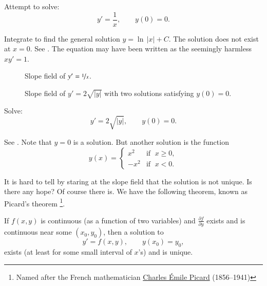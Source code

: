 \documentclass[12pt]{book}
\begin{document}
\begin{example}
Attempt to solve:
\begin{equation*}
y' = \frac{1}{x}, \qquad y(0) = 0 .
\end{equation*}

Integrate to find the general solution $y = \ln \, \lvert x \rvert + C$.  The
solution does not exist at $x=0$.  See .
The equation may have been written as the seemingly harmless $x y' = 1$.

\begin{figure}[h!t]
\begin{center}
\parbox[t]{3.1in}{
 \capstart
 \caption{Slope field of $y' = \nicefrac{1}{x}$.\label{1.3:xinvfig}}
}
\quad
\parbox[t]{3.1in}{
 \capstart
 \caption{Slope field of $y' = 2 \sqrt{\lvert y \rvert}$ with two
 solutions satisfying $y(0) = 0$.\label{1.3:sqrtfig}}
}
\end{center}
\end{figure}
\end{example}

\begin{example}
Solve:
\begin{equation*}
y' = 2 \sqrt{\lvert y \rvert}, \qquad y(0) = 0 .
\end{equation*}

See .
Note that $y=0$ is a solution.  But another solution is the function
\begin{equation*}
y(x) =
\begin{cases}
x^2 & \text{if } \; x \geq 0,\\
-x^2 & \text{if } \; x < 0.
\end{cases}
\end{equation*}
\end{example}

It is hard to tell by staring at the slope field that the
solution is not
unique.
Is there any hope?
Of course there is.  We have the following theorem,
known as Picard's theorem%
\footnote{Named after the French mathematician
\href{http://en.wikipedia.org/wiki/Charles_\%C3\%89mile_Picard}{Charles \'Emile Picard}
(1856--1941)}. 

\begin{theorem}%
\label{slope:picardthm}%
If $f(x,y)$ is continuous (as a function of two
variables) and $\frac{\partial f}{\partial y}$ exists and is
continuous near some $(x_0,y_0)$, then a solution to
\begin{equation*}
y' = f(x,y), \qquad y(x_0) = y_0,
\end{equation*}
exists (at least for some small interval of $x$'s) and is unique.
\end{theorem}
\end{document}
